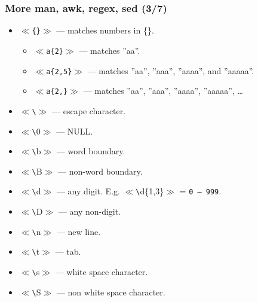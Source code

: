 \documentclass[aspectratio=169, xcolor=table, notheorems, hyperref={pdfpagelabels=false}]{beamer}
\begin{document}
\begin{frame}[fragile]
\frametitle{More man, awk, regex, sed (3/7)}
\begin{itemize}
\item $\ll$\texttt{\{\}}$\gg$ --- matches numbers in \{\}.
\begin{itemize}
\item $\ll$\texttt{a\{2\}}$\gg$ --- matches ''aa''.
\item $\ll$\texttt{a\{2,5\}}$\gg$ --- matches ''aa'', ''aaa'', ''aaaa'', and ''aaaaa''.
\item $\ll$\texttt{a\{2,\}}$\gg$ --- matches ''aa'', ''aaa'', ''aaaa'', ''aaaaa'', \ldots
\end{itemize}
\item $\ll$\texttt{\textbackslash}$\gg$ --- escape character.
\item $\ll$\texttt{\textbackslash}0$\gg$ --- NULL.
\item $\ll$\texttt{\textbackslash}b$\gg$ --- word boundary.
\item $\ll$\texttt{\textbackslash}B$\gg$ --- non-word boundary.
\item $\ll$\texttt{\textbackslash}d$\gg$ --- any digit. E.g. $\ll$\texttt{\textbackslash}d\{1,3\}$\gg$
      = \texttt{0 -- 999}.
\item $\ll$\texttt{\textbackslash}D$\gg$ --- any non-digit.
\item $\ll$\texttt{\textbackslash}n$\gg$ --- new line.
\item $\ll$\texttt{\textbackslash}t$\gg$ --- tab.
\item $\ll$\texttt{\textbackslash}s$\gg$ --- white space character.
\item $\ll$\texttt{\textbackslash}S$\gg$ --- non white space character.
\end{itemize}
\end{frame}
\end{document}
